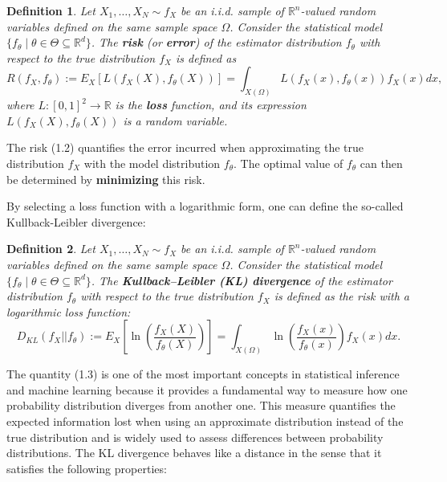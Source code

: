 \documentclass{report}
\newtheorem{definition}{Definition}[chapter]
\begin{document}
\begin{definition}
Let $X_1,\dots,X_N \sim f_X$ be an i.i.d. sample of $\mathbb{R}^n$-valued random variables defined on the same sample space $\Omega$. Consider the statistical model $\{f_\theta \mid\theta\in\Theta\subseteq\mathbb{R}^d\}$. The \textbf{risk} (or \textbf{error}) of the estimator distribution $f_\theta$ with respect to the true distribution $f_X$ is defined as
\begin{equation}
R(f_X,f_\theta) := E_X[L(f_X(X),f_\theta(X))] = \int_{X(\Omega)} L(f_X(x),f_\theta(x))f_X(x)dx,
\end{equation}
where $L : [0,1]^2 \to \mathbb{R}$ is the \textbf{loss} function, and its expression $L(f_X(X), f_\theta(X))$ is a random variable.
\end{definition}

The risk (1.2) quantifies the error incurred when approximating the true distribution $f_X$ with the model distribution $f_\theta$. The optimal value of $f_\theta$ can then be determined by \textbf{minimizing} this risk.

By selecting a loss function with a logarithmic form, one can define the so-called Kullback-Leibler divergence:

\begin{definition}
Let $X_1,\dots,X_N \sim f_X$ be an i.i.d. sample of $\mathbb{R}^n$-valued random variables defined on the same sample space $\Omega$. Consider the statistical model $\{f_\theta \mid\theta\in\Theta\subseteq\mathbb{R}^d\}$. The \textbf{Kullback–Leibler (KL) divergence} of the estimator distribution $f_\theta$ with respect to the true distribution $f_X$ is defined as the risk with a logarithmic loss function:
\begin{equation}
D_{KL}(f_X||f_\theta) := E_X \left[\ln\left(\frac{f_X(X)}{f_\theta(X)}\right)\right] = \int_{X(\Omega)} \ln \left( \frac{f_X(x)}{f_\theta(x)}  \right)f_X(x)dx.
\end{equation}
\end{definition}

The quantity (1.3) is one of the most important concepts in statistical inference and machine learning because it provides a fundamental way to measure how one probability distribution diverges from another one. This measure quantifies the expected information lost when using an approximate distribution instead of the true distribution and is widely used to assess differences between probability distributions. The KL divergence behaves like a distance in the sense that it satisfies the following properties:
\end{document}
